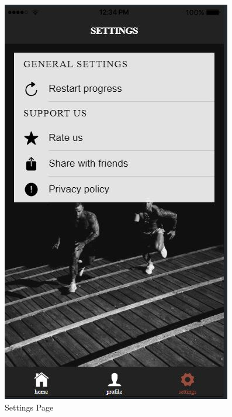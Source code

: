 \documentclass[a4paper,12pt]{article}
\begin{document}
		\begin{figure}[!htb]
			\caption{Settings Page}
			\vspace*{0.5cm}

			  \includegraphics[width=\linewidth]{settings1}
			\endminipage\hfill

\end{figure}
\end{document}
